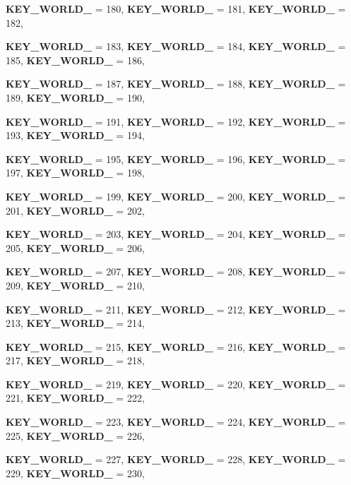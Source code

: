 \begin{DoxyCompactItemize}
{\bfseries KEY\_\-WORLD\_} =  180, 
{\bfseries KEY\_\-WORLD\_} =  181, 
{\bfseries KEY\_\-WORLD\_} =  182, 
\par
{\bfseries KEY\_\-WORLD\_} =  183, 
{\bfseries KEY\_\-WORLD\_} =  184, 
{\bfseries KEY\_\-WORLD\_} =  185, 
{\bfseries KEY\_\-WORLD\_} =  186, 
\par
{\bfseries KEY\_\-WORLD\_} =  187, 
{\bfseries KEY\_\-WORLD\_} =  188, 
{\bfseries KEY\_\-WORLD\_} =  189, 
{\bfseries KEY\_\-WORLD\_} =  190, 
\par
{\bfseries KEY\_\-WORLD\_} =  191, 
{\bfseries KEY\_\-WORLD\_} =  192, 
{\bfseries KEY\_\-WORLD\_} =  193, 
{\bfseries KEY\_\-WORLD\_} =  194, 
\par
{\bfseries KEY\_\-WORLD\_} =  195, 
{\bfseries KEY\_\-WORLD\_} =  196, 
{\bfseries KEY\_\-WORLD\_} =  197, 
{\bfseries KEY\_\-WORLD\_} =  198, 
\par
{\bfseries KEY\_\-WORLD\_} =  199, 
{\bfseries KEY\_\-WORLD\_} =  200, 
{\bfseries KEY\_\-WORLD\_} =  201, 
{\bfseries KEY\_\-WORLD\_} =  202, 
\par
{\bfseries KEY\_\-WORLD\_} =  203, 
{\bfseries KEY\_\-WORLD\_} =  204, 
{\bfseries KEY\_\-WORLD\_} =  205, 
{\bfseries KEY\_\-WORLD\_} =  206, 
\par
{\bfseries KEY\_\-WORLD\_} =  207, 
{\bfseries KEY\_\-WORLD\_} =  208, 
{\bfseries KEY\_\-WORLD\_} =  209, 
{\bfseries KEY\_\-WORLD\_} =  210, 
\par
{\bfseries KEY\_\-WORLD\_} =  211, 
{\bfseries KEY\_\-WORLD\_} =  212, 
{\bfseries KEY\_\-WORLD\_} =  213, 
{\bfseries KEY\_\-WORLD\_} =  214, 
\par
{\bfseries KEY\_\-WORLD\_} =  215, 
{\bfseries KEY\_\-WORLD\_} =  216, 
{\bfseries KEY\_\-WORLD\_} =  217, 
{\bfseries KEY\_\-WORLD\_} =  218, 
\par
{\bfseries KEY\_\-WORLD\_} =  219, 
{\bfseries KEY\_\-WORLD\_} =  220, 
{\bfseries KEY\_\-WORLD\_} =  221, 
{\bfseries KEY\_\-WORLD\_} =  222, 
\par
{\bfseries KEY\_\-WORLD\_} =  223, 
{\bfseries KEY\_\-WORLD\_} =  224, 
{\bfseries KEY\_\-WORLD\_} =  225, 
{\bfseries KEY\_\-WORLD\_} =  226, 
\par
{\bfseries KEY\_\-WORLD\_} =  227, 
{\bfseries KEY\_\-WORLD\_} =  228, 
{\bfseries KEY\_\-WORLD\_} =  229, 
{\bfseries KEY\_\-WORLD\_} =  230, 
\par

\end{DoxyCompactItemize}

